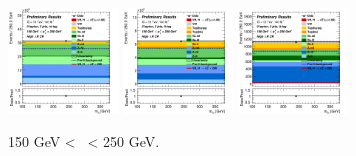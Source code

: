 \begin{figure}[h!]
    \centering
    \begin{subfigure}[b]{\textwidth}
        \centering
        \includegraphics[width=0.32\textwidth]{Images/VH/Own_fit/postfit_VHcc/Region_distmBB_BMax250_BMin150_DCRHigh_J3_TTypent_T1_L0_Y6051_GlobalFit_conditionnal_mu1.png}
        \includegraphics[width=0.32\textwidth]{Images/VH/Own_fit/postfit_VHcc/Region_distmBB_BMax250_BMin150_DCRHigh_J3_TTypelt_T2_L0_Y6051_GlobalFit_conditionnal_mu1.png}
        \includegraphics[width=0.32\textwidth]{Images/VH/Own_fit/postfit_VHcc/Region_distmBB_BMax250_BMin150_DCRHigh_J3_TTypett_T2_L0_Y6051_GlobalFit_conditionnal_mu1.png}
        \caption{150 GeV < \ptv\ < 250 GeV.}
        \label{fig:plots_VHcc_OL_150_CRH_2c_3J}
    \end{subfigure}
    \begin{subfigure}[b]{\textwidth}
        \centering


\end{subfigure}
\end{figure}

